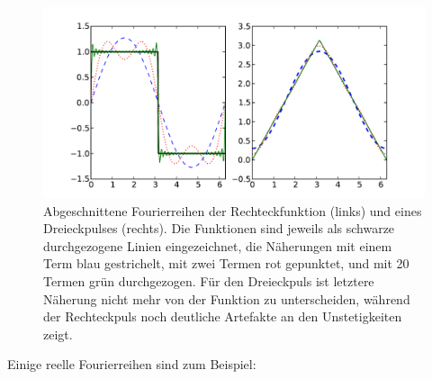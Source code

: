 \begin{figure}
  \centering
  \includegraphics[width=\textwidth]{plots/fourier}
  \caption{Abgeschnittene Fourierreihen der Rechteckfunktion (links)
    und eines Dreieckpulses (rechts). Die Funktionen sind jeweils als
    schwarze durchgezogene Linien eingezeichnet, die Näherungen mit
    einem Term blau gestrichelt, mit zwei Termen rot gepunktet, und
    mit 20 Termen grün durchgezogen. Für den Dreieckpuls ist letztere
    Näherung nicht mehr von der Funktion zu unterscheiden, während der
    Rechteckpuls noch deutliche Artefakte an den Unstetigkeiten zeigt.}
  \label{fig:fourier}
\end{figure}
Einige reelle Fourierreihen sind zum Beispiel:
